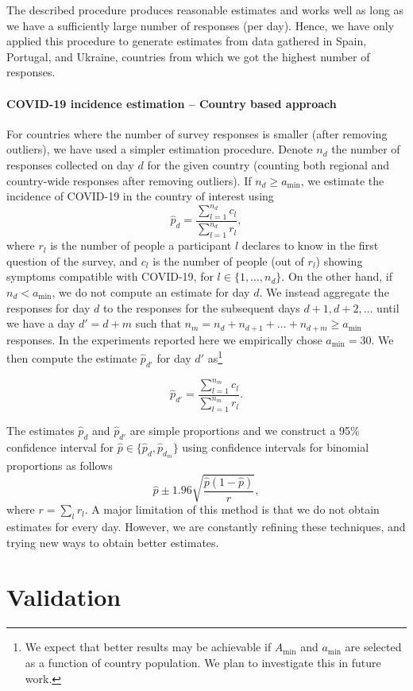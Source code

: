 \documentclass[sigconf,authordraft]{acmart}
\begin{document}
The described procedure produces reasonable estimates 
and works well as long as we have a sufficiently large number of responses (per day).  
Hence, we have only applied this procedure to generate estimates from data gathered in Spain, Portugal, and Ukraine, countries from which we got the highest number of responses. 

\paragraph{COVID-19 incidence estimation -- Country based approach}
For countries where the number of survey responses is smaller (after removing outliers), we have used a simpler estimation procedure. Denote $n_d$ the number of responses collected on day $d$ for the given country (counting both regional and country-wide responses after removing outliers). If $n_d \geq a_{\min}$, we estimate the incidence of COVID-19 in the country of interest using
$$
\hat{p}_d = \frac{\sum_{l = 1}^{n_d} c_l}{\sum_{l = 1}^{n_d} r_l},
$$
where $r_l$ is the number of people a participant $l$ declares to know in the first question of the survey, and $c_l$ is the number of people (out of $r_l$) showing symptoms compatible with COVID-19, for $l \in \{1,\ldots, n_d\}$. On the other hand, if $n_d < a_{\min}$, we do not compute an estimate for day $d$. We instead aggregate the responses for day $d$ to the responses for the subsequent days $d+1, d+2, \ldots$ until we have a day $d'=d+m$ such that $n_m = n_d + n_{d+1} + \ldots + n_{d+m} \geq a_{\min}$ responses. In the experiments reported here we empirically chose $a_{\min}=30$.  We then compute the estimate $\hat{p}_{d'}$ for day $d'$ as\footnote{We expect that better results may be achievable if $A_{\min}$ and $a_{\min}$ are selected as a function of country population. We plan to investigate this in future work.}

$$\hat{p}_{d'} = \frac{\sum_{l = 1}^{n_m} c_l}{\sum_{l = 1}^{n_m} r_l}.$$

The estimates $\hat{p}_d$ and $\hat{p}_{d'}$ are simple proportions and we construct a 95\% confidence interval for $\hat{p} \in \{\hat{p}_d, \hat{p}_{d_m}\}$ using confidence intervals for binomial proportions as follows
$$\hat{p} \pm 1.96\sqrt{\frac{\hat{p}(1-\hat{p})}{r}},$$
where $r = \sum_{l} r_l$. A major limitation of this method is that we do not obtain estimates for every day. However, we are constantly refining these techniques, and trying new ways to obtain better estimates. 

\section{Validation}
\end{document}
